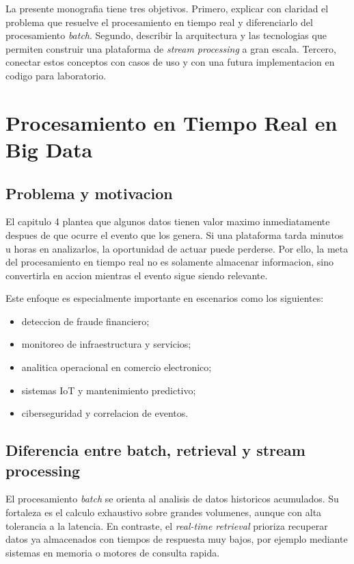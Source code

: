 \documentclass[12pt,a4paper]{article}
\begin{document}
La presente monografia tiene tres objetivos. Primero, explicar con claridad el problema que resuelve el procesamiento en tiempo real y diferenciarlo del procesamiento \textit{batch}. Segundo, describir la arquitectura y las tecnologias que permiten construir una plataforma de \textit{stream processing} a gran escala. Tercero, conectar estos conceptos con casos de uso y con una futura implementacion en codigo para laboratorio.

\section{Procesamiento en Tiempo Real en Big Data}

\subsection{Problema y motivacion}

El capitulo 4 plantea que algunos datos tienen valor maximo inmediatamente despues de que ocurre el evento que los genera. Si una plataforma tarda minutos u horas en analizarlos, la oportunidad de actuar puede perderse. Por ello, la meta del procesamiento en tiempo real no es solamente almacenar informacion, sino convertirla en accion mientras el evento sigue siendo relevante.

Este enfoque es especialmente importante en escenarios como los siguientes:

\begin{itemize}
  \item deteccion de fraude financiero;
  \item monitoreo de infraestructura y servicios;
  \item analitica operacional en comercio electronico;
  \item sistemas IoT y mantenimiento predictivo;
  \item ciberseguridad y correlacion de eventos.
\end{itemize}

\subsection{Diferencia entre batch, retrieval y stream processing}

El procesamiento \textit{batch} se orienta al analisis de datos historicos acumulados. Su fortaleza es el calculo exhaustivo sobre grandes volumenes, aunque con alta tolerancia a la latencia. En contraste, el \textit{real-time retrieval} prioriza recuperar datos ya almacenados con tiempos de respuesta muy bajos, por ejemplo mediante sistemas en memoria o motores de consulta rapida.
\end{document}
